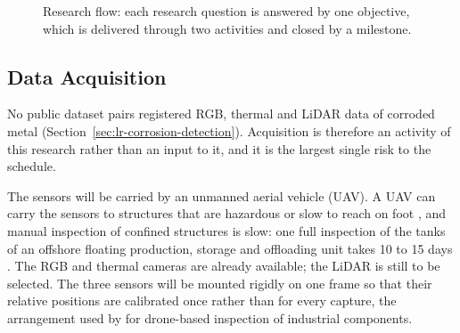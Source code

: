 \begin{figure}[htbp]
\centering
{}
\caption[Research flow]{Research flow: each research question is answered by one objective,
which is delivered through two activities and closed by a milestone.}
\label{fig:flow}
\end{figure}

\subsection{Data Acquisition}
\label{sec:acquisition}

No public dataset pairs registered RGB, thermal and LiDAR data of corroded metal
(Section~\ref{sec:lr-corrosion-detection}). Acquisition is therefore an activity
of this research rather than an input to it, and it is the largest single risk
to the schedule.

The sensors will be carried by an unmanned aerial vehicle (UAV). A UAV can carry
the sensors to structures that are hazardous or slow to reach on foot
\citep{Savino2025,Nooralishahi2022}, and manual inspection of confined
structures is slow: one full inspection of the tanks of an offshore floating
production, storage and offloading unit takes 10 to 15 days \citep{Soares2023}.
The RGB and thermal cameras are already available; the LiDAR is still to be
selected. The three sensors will be mounted rigidly on one frame so that their
relative positions are calibrated once rather than for every capture, the
arrangement used by \citet{Nooralishahi2022} for drone-based inspection of
industrial components.

